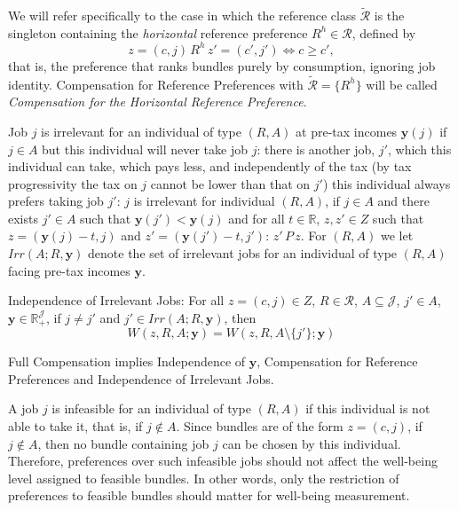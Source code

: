 We will refer specifically to the case in which the reference class $\tilde{\mathcal R}$ is the singleton containing the \emph{horizontal} reference preference $R^h\in\mathcal R$, defined by
\begin{equation*}
z=(c,j)\,R^h\,z'=(c',j')\Leftrightarrow c\geq c',
\end{equation*}
that is, the preference that ranks bundles purely by consumption, ignoring job identity. Compensation for Reference Preferences with $\tilde{\mathcal R}=\{R^h\}$ will be called \emph{Compensation for the Horizontal Reference Preference}.

Job $j$ is irrelevant for an individual of type $(R,A)$ at pre-tax incomes $\mathbf{y}(j)$ if $j\in A$ but this individual will never take job $j$: there is another job, $j'$, which this individual can take, which pays less, and independently of the tax (by tax progressivity the tax on $j$ cannot be lower than that on $j'$) this individual always prefers taking job $j'$: $j$ is irrelevant for individual $(R,A)$, if $j\in A$ and there exists $j'\in A$ such that $\mathbf{y}(j')<\mathbf{y}(j)$ and for all $t\in\mathbb{R}$, $z,z'\in Z$ such that $z=(\mathbf{y}(j)-t,j)$ and $z'=(\mathbf{y}(j')-t,j')$: $z'\,P\,z$. For $(R,A)$ we let $Irr(A;R,\mathbf{y})$ denote the set of irrelevant jobs for an individual of type $(R,A)$ facing pre-tax incomes $\mathbf{y}$.

Independence of Irrelevant Jobs: For all $z=(c,j)\in Z$, $R\in \mathcal{R}$, $A\subseteq \mathcal{J}$, $j'\in A$, $\mathbf{y} \in \mathbb{R}_{+}^{\mathcal{J}}$, if $j\neq j'$ and $j'\in Irr(A;R,\mathbf{y})$, then
\begin{equation*}
\label{ }
W(z,R,A;\mathbf{y})=W(z,R,A\setminus\{j'\};\mathbf{y})
\end{equation*}

Full Compensation implies Independence of $\mathbf{y}$, Compensation for Reference Preferences and Independence of Irrelevant Jobs.



A job $j$ is infeasible for an individual of type $(R,A)$ if this individual is not able to take it, that is, if $j\notin A$. Since bundles are of the form $z=(c,j)$, if $j\notin A$, then no bundle containing job $j$ can be chosen by this individual. Therefore, preferences over such infeasible jobs should not affect the well-being level assigned to feasible bundles. In other words, only the restriction of preferences to feasible bundles should matter for well-being measurement.


